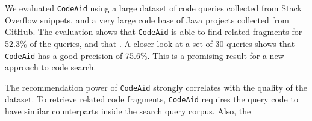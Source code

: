 \documentclass[conference]{IEEEtran}
\newcommand{\ttt}[1]{\tt\small{#1}}
\newcommand{\tool}{{\ttt CodeAid}}
\begin{document}
We evaluated {\tool} using a large dataset of code queries collected
from Stack Overflow snippets, and a very large code base of Java
projects collected from GitHub. The evaluation shows that {\tool} is
able to find related fragments for 52.3\% of the queries, and
that . A closer look at a set of 30
queries shows that {\tool} has a good precision of 75.6\%. This is
a promising result for a new approach to code search. 

The recommendation power of {\tool} strongly correlates with the quality of the dataset. To retrieve related code fragments, {\tool} requires the query code to have similar counterparts inside the search query corpus. Also, the 






\end{document}
